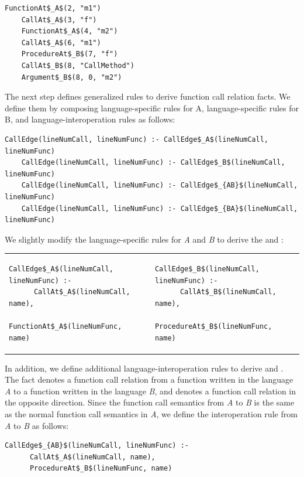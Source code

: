 \begin{lstlisting}[style=mrule]
    FunctionAt$_A$(2, "m1")
    CallAt$_A$(3, "f")
    FunctionAt$_A$(4, "m2")
    CallAt$_A$(6, "m1")
    ProcedureAt$_B$(7, "f")
    CallAt$_B$(8, "CallMethod")
    Argument$_B$(8, 0, "m2")
\end{lstlisting}

The next step defines generalized rules to derive function call relation facts.
We define them by composing language-specific rules for A, language-specific
rules for B, and language-interoperation rules as follows:

\begin{lstlisting}[style=mrule]
    CallEdge(lineNumCall, lineNumFunc) :- CallEdge$_A$(lineNumCall, lineNumFunc)
    CallEdge(lineNumCall, lineNumFunc) :- CallEdge$_B$(lineNumCall, lineNumFunc)
    CallEdge(lineNumCall, lineNumFunc) :- CallEdge$_{AB}$(lineNumCall, lineNumFunc)
    CallEdge(lineNumCall, lineNumFunc) :- CallEdge$_{BA}$(lineNumCall, lineNumFunc)
\end{lstlisting}

\noindent
We slightly modify the language-specific rules for {\it A} and {\it B} to
derive the  and :

\begin{tabular}{ll}
  {\begin{lstlisting}[style=mrule]
    CallEdge$_A$(lineNumCall, lineNumFunc) :-
      CallAt$_A$(lineNumCall, name),
      FunctionAt$_A$(lineNumFunc, name)
  \end{lstlisting}} &
  {\begin{lstlisting}[style=mrule]
    CallEdge$_B$(lineNumCall, lineNumFunc) :-
      CallAt$_B$(lineNumCall, name),
      ProcedureAt$_B$(lineNumFunc, name)
  \end{lstlisting}}
\end{tabular}

\noindent
In addition, we define additional language-interoperation rules to derive
 and . The fact  denotes a function call relation from a function written in
the language {\it A} to a function written in the language {\it B}, and  denotes a function call relation in the opposite direction.
Since the function call semantics from {\it A} to {\it B} is the same as the
normal function call semantics in {\it A}, we define the interoperation rule
from {\it A} to {\it B} as follows:

\begin{lstlisting}[style=mrule]
    CallEdge$_{AB}$(lineNumCall, lineNumFunc) :-
      CallAt$_A$(lineNumCall, name),
      ProcedureAt$_B$(lineNumFunc, name)
\end{lstlisting}

